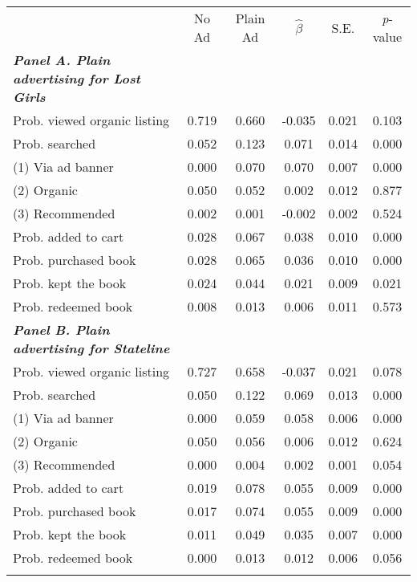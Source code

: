 \begin{center}
\begin{tabular}{lccccc}
\hline \noalign{\smallskip}  & No Ad & Plain Ad & $\hat{\beta}$ & S.E. & \emph{p}-value\\
\noalign{\smallskip}\hline \noalign{\smallskip}\textbf{\emph{Panel A. Plain advertising for Lost Girls}} &  &  &  &  & \\
Prob. viewed organic listing & 0.719 & 0.660 & -0.035 & 0.021 & 0.103\\
Prob. searched & 0.052 & 0.123 & 0.071 & 0.014 & 0.000\\
\hspace{15pt} (1) Via ad banner & 0.000 & 0.070 & 0.070 & 0.007 & 0.000\\
\hspace{15pt} (2) Organic & 0.050 & 0.052 & 0.002 & 0.012 & 0.877\\
\hspace{15pt} (3) Recommended & 0.002 & 0.001 & -0.002 & 0.002 & 0.524\\
Prob. added to cart & 0.028 & 0.067 & 0.038 & 0.010 & 0.000\\
Prob. purchased book & 0.028 & 0.065 & 0.036 & 0.010 & 0.000\\
Prob. kept the book & 0.024 & 0.044 & 0.021 & 0.009 & 0.021\\
Prob. redeemed book & 0.008 & 0.013 & 0.006 & 0.011 & 0.573\\
\textbf{\emph{Panel B. Plain advertising for Stateline}} &  &  &  &  & \\
Prob. viewed organic listing & 0.727 & 0.658 & -0.037 & 0.021 & 0.078\\
Prob. searched & 0.050 & 0.122 & 0.069 & 0.013 & 0.000\\
\hspace{15pt} (1) Via ad banner & 0.000 & 0.059 & 0.058 & 0.006 & 0.000\\
\hspace{15pt} (2) Organic & 0.050 & 0.056 & 0.006 & 0.012 & 0.624\\
\hspace{15pt} (3) Recommended & 0.000 & 0.004 & 0.002 & 0.001 & 0.054\\
Prob. added to cart & 0.019 & 0.078 & 0.055 & 0.009 & 0.000\\
Prob. purchased book & 0.017 & 0.074 & 0.055 & 0.009 & 0.000\\
Prob. kept the book & 0.011 & 0.049 & 0.035 & 0.007 & 0.000\\
Prob. redeemed book & 0.000 & 0.013 & 0.012 & 0.006 & 0.056\\
\noalign{\smallskip}\hline\end{tabular}\\
\end{center}
